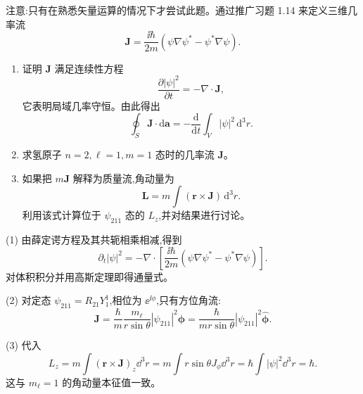 \begin{question}
注意:只有在熟悉矢量运算的情况下才尝试此题。通过推广习题 1.14 来定义三维几率流
\[
\mathbf J=\frac{\ii\hbar}{2m}(\psi\nabla\psi^*-\psi^*\nabla\psi).
\]
\begin{enumerate}
\item 证明 $\mathbf J$ 满足连续性方程
\[
\frac{\partial |\psi|^2}{\partial t}=-\nabla\cdot\mathbf J,
\]
它表明局域几率守恒。由此得出
\[
\oint_S \mathbf J\cdot\mathrm d\mathbf a=-\frac{\mathrm d}{\mathrm dt}\int_V |\psi|^2\,\mathrm d^3r.
\]
\item 求氢原子 $n=2,\ell=1,m=1$ 态时的几率流 $\mathbf J$。
\item 如果把 $m\mathbf J$ 解释为质量流,角动量为
\[
\mathbf L=m\int (\mathbf r\times\mathbf J)\,\mathrm d^3r.
\]
利用该式计算位于 $\psi_{211}$ 态的 $L_z$,并对结果进行讨论。
\end{enumerate}
\begin{solution}

(1) 由薛定谔方程及其共轭相乘相减,得到
\[
\partial_t|\psi|^2=-\nabla\cdot\left[\frac{\ii\hbar}{2m}(\psi\nabla\psi^*-\psi^*\nabla\psi)\right].
\]
对体积积分并用高斯定理即得通量式。

(2) 对定态 $\psi_{211}=R_{21}Y_1^1$,相位为 $\ee^{\ii\phi}$,只有方位角流:
\[
\mathbf J=\frac{\hbar}{m}\frac{m_\ell}{r\sin\theta}|\psi_{211}|^2\hat{\boldsymbol\phi}
=\frac{\hbar}{mr\sin\theta}|\psi_{211}|^2\hat{\boldsymbol\phi}.
\]

(3) 代入
\[
L_z=m\int (\mathbf r\times\mathbf J)_z\dd^3r
=m\int r\sin\theta J_\phi\dd^3r
=\hbar\int|\psi|^2\dd^3r=\hbar.
\]
这与 $m_\ell=1$ 的角动量本征值一致。

\end{solution}
\end{question}

